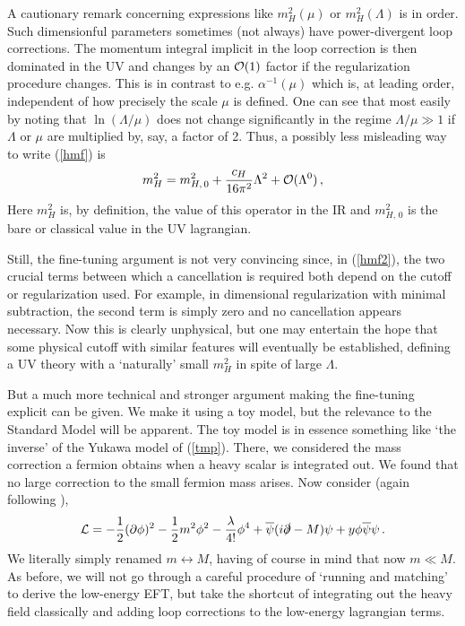 \documentclass[12pt]{article}
\newcommand{\be}{\begin{equation}}
\newcommand{\ee}{\end{equation}}
\newcommand{\ol}{\overline}
\numberwithin{equation}{section}
\begin{document}
A cautionary remark concerning expressions like $m_H^2(\mu)$ or $m_H^2(\Lambda)$ is in order. Such dimensionful parameters sometimes (not always) have power-divergent loop corrections. The momentum integral implicit in the loop correction is then dominated in the UV and changes by an ${\cal O}(1)$ factor if the regularization procedure changes. This is in contrast to e.g. $\alpha^{-1}(\mu)$ which is, at leading order, independent of how precisely the scale $\mu$ is defined. One can see that most easily by noting that $\ln(\Lambda/\mu)$ does not change significantly in the regime $\Lambda/\mu\gg 1$ if $\Lambda$ or $\mu$ are multiplied by, say, a factor of 2. Thus, a possibly less misleading way to write (\ref{hmf}) is
\be
m_H^2=m_{H,\,0}^2+\frac{c_H}{16\pi^2}\Lambda^2+{\cal O}(\Lambda^0)\,,
\label{hmf2}
\ee
Here $m_H^2$ is, by definition, the value of this operator in the IR and $m_{H,\,0}^2$ is the bare or classical value in the UV lagrangian. 

Still, the fine-tuning argument is not very convincing since, in (\ref{hmf2}), the two crucial terms between which a cancellation is required both depend on the cutoff or regularization used. For example, in dimensional regularization with minimal subtraction, the second term is simply zero and no cancellation appears necessary. Now this is clearly unphysical, but one may entertain the hope that some physical cutoff with similar features will eventually be established, defining a UV theory with a `naturally' small $m_H^2$ in spite of large $\Lambda$. 

But a much more technical and stronger argument making the fine-tuning explicit can be given. We make it using a toy model, but the relevance to the Standard Model will be apparent. The toy model is in essence something like `the inverse' of the Yukawa model of (\ref{tmp}). There, we considered the mass correction a fermion obtains when a heavy scalar is integrated out. We found that no large correction to the small fermion mass arises. Now consider (again following \cite{Luty:2005sn}), 
\be
{\cal L}=-\frac{1}{2}(\partial\phi)^2-\frac{1}{2}m^2\phi^2-\frac{\lambda}{4!}\phi^4+\ol{\psi}(i\slashed{\partial}-M)\psi+y\phi\ol{\psi}\psi\,.
\ee
We literally simply renamed $m\leftrightarrow M$, having of course in mind that now $m\ll M$. As before, we will not go through a careful procedure of `running and matching' to derive the low-energy EFT, but take the shortcut of integrating out the heavy field classically and adding loop corrections to the low-energy lagrangian terms. 
\end{document}
